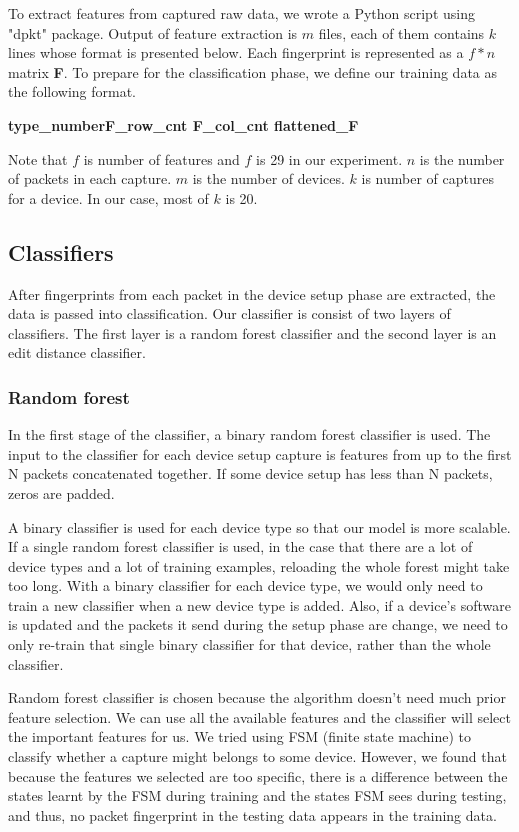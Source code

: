 \documentclass[twocolumn,10pt]{article}
\begin{document}
To extract features from captured raw data, we wrote a Python script using "dpkt" package. Output of feature extraction is $m$ files, each of them contains $k$ lines whose format is presented below. Each fingerprint is represented as a $f*n$ matrix {\bf F}. To prepare for the classification phase, we define our training data as the following format.

{\bf type\_number\quad F\_row\_cnt \quad F\_col\_cnt \quad flattened\_F}

Note that $f$ is number of features and $f$ is 29 in our experiment. $n$ is the number of packets in each capture. $m$ is the number of devices. $k$ is number of captures for a device. In our case, most of $k$ is 20.


\subsection{Classifiers}

After fingerprints from each packet in the device setup phase are extracted, the data is passed into classification. Our classifier is consist of two layers of classifiers. The first layer is a random forest classifier and the second layer is an edit distance classifier. 

\subsubsection{Random forest}

In the first stage of the classifier, a binary random forest classifier is used. The input to the classifier for each device setup capture is features from up to the first N packets concatenated together. If some device setup has less than N packets, zeros are padded.

A binary classifier is used for each device type so that our model is more scalable. If a single random forest classifier is used, in the case that there are a lot of device types and a lot of training examples, reloading the whole forest might take too long. With a binary classifier for each device type, we would only need to train a new classifier when a new device type is added. Also, if a device’s software is updated and the packets it send during the setup phase are change, we need to only re-train that single binary classifier for that device, rather than the whole classifier.

Random forest classifier is chosen because the algorithm doesn’t need much prior feature selection. We can use all the available features and the classifier will select the important features for us. We tried using FSM (finite state machine) to classify whether a capture might belongs to some device. However, we found that because the features we selected are too specific, there is a difference between the states learnt by the FSM during training and the states FSM sees during testing, and thus, no packet fingerprint in the testing data appears in the training data.
\end{document}
